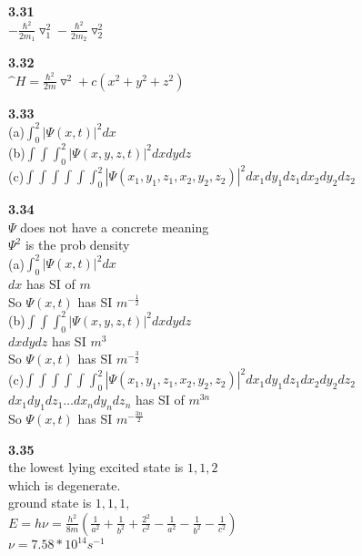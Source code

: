 \documentclass{article}
\begin{document}
\textbf{3.31}\\
$-\frac{\hbar^2}{2m_1}\triangledown_1^2 -\frac{\hbar^2}{2m_2}\triangledown_2^2$\\
\newline

\textbf{3.32}\\
$\^{H} = \frac{\hbar^2}{2m}\triangledown^2+c(x^2+y^2+z^2)$\\
\newline

\textbf{3.33}\\
(a)$\int_0^2|\Psi(x,t)|^2dx$\\
(b)$\int\int\int_0^2|\Psi(x,y,z,t)|^2dxdydz$\\
(c)$\int\int\int\int\int\int_0^2|\Psi(x_1,y_1,z_1,x_2,y_2,z_2)|^2dx_1dy_1dz_1dx_2dy_2dz_2$\\
\newline

\textbf{3.34}\\
$\Psi$ does not have a concrete meaning\\
$\Psi^2$ is the prob density\\
(a)$\int_0^2|\Psi(x,t)|^2dx$\\
$dx$ has SI of $m$\\
So $\Psi(x,t)$ has SI $m^{-\frac{1}{2}}$\\
(b)$\int\int\int_0^2|\Psi(x,y,z,t)|^2dxdydz$\\
$dxdydz$ has SI $m^3$\\
So $\Psi(x,t)$ has SI $m^{-\frac{3}{2}}$\\
(c)$\int\int\int\int\int\int_0^2|\Psi(x_1,y_1,z_1,x_2,y_2,z_2)|^2dx_1dy_1dz_1dx_2dy_2dz_2$\\
$dx_1dy_1dz_1 \dots dx_ndy_ndz_n$ has SI of $m^{3n}$\\
So  $\Psi(x,t)$ has SI $m^{-\frac{3n}{2}}$\\
\newline

\textbf{3.35}\\
the lowest lying excited state is $1,1,2$\\
which is degenerate.\\
ground state is $1,1,1,$\\
$E = h\nu = \frac{h^2}{8m}(\frac{1}{a^2}+\frac{1}{b^2}+\frac{2^2}{c^2} - \frac{1}{a^2} - \frac{1}{b^2} - \frac{1}{c^2})$\\
$\nu = 7.58*10^{14}s^{-1}$\\
\newline
\end{document}
